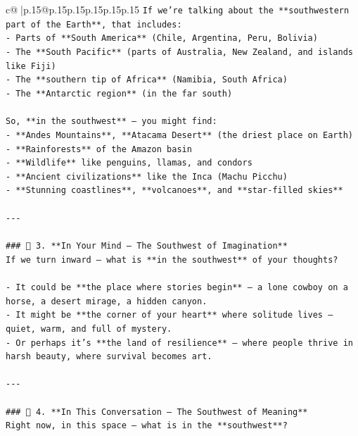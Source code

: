 \documentclass{article}
\begin{document}
{\begin{supertabular}{c@{$\;$}|p{.15\linewidth}@{}p{.15\linewidth}p{.15\linewidth}p{.15\linewidth}p{.15\linewidth}p{.15\linewidth}}
{{{\texttt{If we’re talking about the **southwestern part of the Earth**, that includes:} \\
\texttt{{-} Parts of **South America** (Chile, Argentina, Peru, Bolivia)} \\
\texttt{{-} The **South Pacific** (parts of Australia, New Zealand, and islands like Fiji)} \\
\texttt{{-} The **southern tip of Africa** (Namibia, South Africa)} \\
\texttt{{-} The **Antarctic region** (in the far south)} \\
\\ 
\texttt{So, **in the southwest** — you might find:} \\
\texttt{{-} **Andes Mountains**, **Atacama Desert** (the driest place on Earth)} \\
\texttt{{-} **Rainforests** of the Amazon basin} \\
\texttt{{-} **Wildlife** like penguins, llamas, and condors} \\
\texttt{{-} **Ancient civilizations** like the Inca (Machu Picchu)} \\
\texttt{{-} **Stunning coastlines**, **volcanoes**, and **star{-}filled skies**} \\
\\ 
\texttt{{-}{-}{-}} \\
\\ 
\texttt{\#\#\# 🧠 3. **In Your Mind — The Southwest of Imagination**} \\
\texttt{If we turn inward — what is **in the southwest** of your thoughts?} \\
\\ 
\texttt{{-} It could be **the place where stories begin** — a lone cowboy on a horse, a desert mirage, a hidden canyon.} \\
\texttt{{-} It might be **the corner of your heart** where solitude lives — quiet, warm, and full of mystery.} \\
\texttt{{-} Or perhaps it’s **the land of resilience** — where people thrive in harsh beauty, where survival becomes art.} \\
\\ 
\texttt{{-}{-}{-}} \\
\\ 
\texttt{\#\#\# 🌵 4. **In This Conversation — The Southwest of Meaning**} \\
\texttt{Right now, in this space — what is in the **southwest**?} \\
\\ 
}}}
\end{supertabular}}
\end{document}
